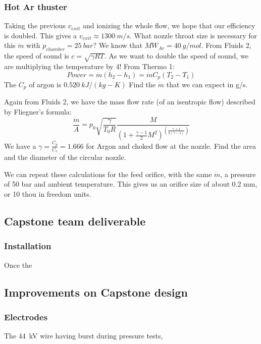             \subsubsection{Hot Ar thuster}
            Taking the previous $v_{exit}$ and ionizing the whole flow, we hope that our efficiency is doubled. This gives a $v_{exit}\approx 1300\:m/s$. What nozzle throat size is necessary for this $\dot m$ with $p_{chamber} = 25\: bar$? We know that $MW_{Ar} = 40 \: g/mol$. From Fluids 2, the speed of sound is $c = \sqrt{\gamma R T}$. As we want to double the speed of sound, we are multiplying the temperature by 4! From Thermo 1:
            \[Power = \dot m (h_2-h_1)
            = \dot m C_p (T_2-T_1)\]
            The $C_p$ of argon is $0.520\:kJ/(kg-K)$ Find the $\dot m$ that we can expect in g/s.\vspace{60mm}
            
            Again from Fluids 2, we have the mass flow rate (of an isentropic flow) described by Fliegner's formula:
            \[\frac{\dot m}{A} = p_0\sqrt{\frac{\gamma}{T_0 R}}\frac{M}{(1+\frac{\gamma-1}{2}M^2)^{(\frac{\gamma+1}{2(\gamma-1)})}}\]
            We have a $\gamma = \frac{C_p}{C_v} = 1.666$ for Argon and choked flow at the nozzle. Find the area and the diameter of the circular nozzle.\vspace{170 mm}
            
            We can repeat these calculations for the feed orifice, with the same $\dot m$, a pressure of 50 bar and ambient temperature. This gives us an orifice size of about 0.2 mm, or 10 thou in freedom units.

        \subsection{Capstone team deliverable}
            
            \subsubsection{Installation}

                Once the 

        \subsection{Improvements on Capstone design}

            \subsubsection{Electrodes}
                The \qty{44}{kV} wire having burst during pressure tests, 

